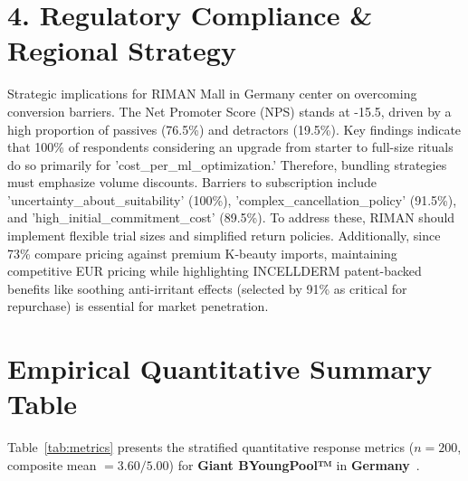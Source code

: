 \documentclass[10pt,twocolumn,a4paper]{article}
\begin{document}
\section{4. Regulatory Compliance \& Regional Strategy}
Strategic implications for RIMAN Mall in Germany center on overcoming conversion barriers. The Net Promoter Score (NPS) stands at -15.5, driven by a high proportion of passives (76.5\%) and detractors (19.5\%). Key findings indicate that 100\% of respondents considering an upgrade from starter to full-size rituals do so primarily for 'cost\_per\_ml\_optimization.' Therefore, bundling strategies must emphasize volume discounts. Barriers to subscription include 'uncertainty\_about\_suitability' (100\%), 'complex\_cancellation\_policy' (91.5\%), and 'high\_initial\_commitment\_cost' (89.5\%). To address these, RIMAN should implement flexible trial sizes and simplified return policies. Additionally, since 73\% compare pricing against premium K-beauty imports, maintaining competitive EUR pricing while highlighting INCELLDERM patent-backed benefits like soothing anti-irritant effects (selected by 91\% as critical for repurchase) is essential for market penetration.


\section{Empirical Quantitative Summary Table}
Table~\ref{tab:metrics} presents the stratified quantitative response metrics ($n = 200$, composite mean $= 3.60/5.00$) for \textbf{Giant BYoungPool™} in \textbf{Germany}~\cite{ref_kaggle_doi,ref_hf_doi}.
\end{document}
